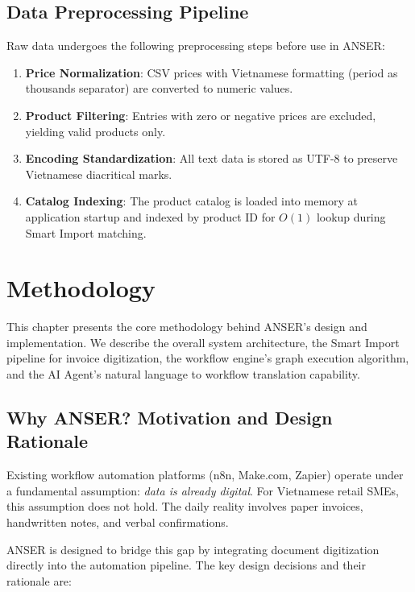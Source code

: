 \documentclass[11pt,a4paper]{report}
\begin{document}
\section{Data Preprocessing Pipeline}

Raw data undergoes the following preprocessing steps before use in ANSER:

\begin{enumerate}
  \item \textbf{Price Normalization}: CSV prices with Vietnamese formatting (period as thousands separator) are converted to numeric values.
  \item \textbf{Product Filtering}: Entries with zero or negative prices are excluded, yielding valid products only.
  \item \textbf{Encoding Standardization}: All text data is stored as UTF-8 to preserve Vietnamese diacritical marks.
  \item \textbf{Catalog Indexing}: The product catalog is loaded into memory at application startup and indexed by product ID for $O(1)$ lookup during Smart Import matching.
\end{enumerate}

\chapter{Methodology}
\label{ch:methodology}

This chapter presents the core methodology behind ANSER's design and implementation. We describe the overall system architecture, the Smart Import pipeline for invoice digitization, the workflow engine's graph execution algorithm, and the AI Agent's natural language to workflow translation capability.

\section{Why ANSER? Motivation and Design Rationale}

Existing workflow automation platforms (n8n, Make.com, Zapier) operate under a fundamental assumption: \emph{data is already digital}. For Vietnamese retail SMEs, this assumption does not hold. The daily reality involves paper invoices, handwritten notes, and verbal confirmations.

ANSER is designed to bridge this gap by integrating document digitization directly into the automation pipeline. The key design decisions and their rationale are:
\end{document}
